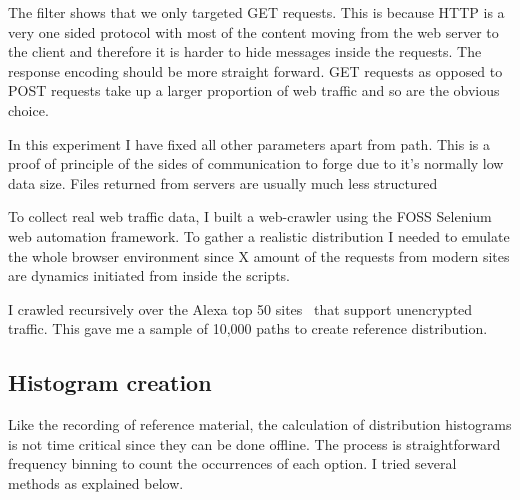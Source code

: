 \documentclass[ %
                    author={Samuel Russell},
                supervisor={Prof. Bogdan Warinschi},
                    degree={MEng},
                     title={Innocuous Ciphertexts},
                  subtitle={The DE-CENSOR Scheme},
                      type={research},
                      year={2018} ]{dissertation}
\begin{document}
The filter shows that we only targeted GET requests. This is because HTTP is a very one sided protocol with most of the content moving from the web server to the client and therefore it is harder to hide messages inside the requests. The response encoding should be more straight forward. GET requests as opposed to POST requests take up a larger proportion of web traffic and so are the obvious choice. 

In this experiment I have fixed all other parameters apart from path. This is a proof of principle
of the sides of communication to forge due to it's normally low data size. Files returned from servers are usually much less structured 

To collect real web traffic data, I built a web-crawler using the FOSS Selenium web automation framework. To gather a realistic distribution I needed to emulate the whole browser environment since X amount of the requests from modern sites are dynamics initiated from inside the scripts.

I crawled recursively over the Alexa top 50 sites~\cite{alexa} that support unencrypted traffic. This gave me a sample of 10,000 paths to create reference distribution.

\subsection{Histogram creation}

Like the recording of reference material, the calculation of distribution histograms is not time critical since they can be done offline. The process is straightforward frequency binning to count the occurrences of each option. I tried several methods as explained below.
\end{document}

